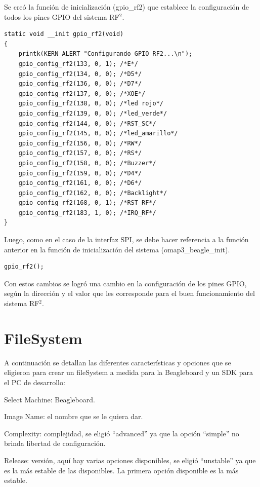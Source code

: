 Se creó la función de inicialización (gpio\_rf2) que establece la configuración de todos los pines GPIO del sistema RF$^{2}$.

\begin{verbatim}
static void __init gpio_rf2(void)
{
    printk(KERN_ALERT "Configurando GPIO RF2...\n");
    gpio_config_rf2(133, 0, 1); /*E*/
    gpio_config_rf2(134, 0, 0); /*D5*/
    gpio_config_rf2(136, 0, 0); /*D7*/
    gpio_config_rf2(137, 0, 0); /*XOE*/
    gpio_config_rf2(138, 0, 0); /*led rojo*/
    gpio_config_rf2(139, 0, 0); /*led_verde*/
    gpio_config_rf2(144, 0, 0); /*RST_SC*/
    gpio_config_rf2(145, 0, 0); /*led_amarillo*/
    gpio_config_rf2(156, 0, 0); /*RW*/
    gpio_config_rf2(157, 0, 0); /*RS*/
    gpio_config_rf2(158, 0, 0); /*Buzzer*/
    gpio_config_rf2(159, 0, 0); /*D4*/
    gpio_config_rf2(161, 0, 0); /*D6*/
    gpio_config_rf2(162, 0, 0); /*Backlight*/
    gpio_config_rf2(168, 0, 1); /*RST_RF*/
    gpio_config_rf2(183, 1, 0); /*IRQ_RF*/
}
\end{verbatim}

Luego, como en el caso de la interfaz SPI, se debe hacer referencia a la función anterior en la función de inicialización del sistema (omap3\_beagle\_init).

\begin{verbatim}
gpio_rf2();
\end{verbatim}

Con estos cambios se logró una cambio en la configuración de los pines GPIO, según la dirección y el valor que les corresponde para el buen funcionamiento del sistema RF$^{2}$.

\section{FileSystem}\label{narc}

A continuación se detallan las diferentes características y opciones que se eligieron para crear un fileSystem a medida para la Beagleboard y un SDK para el PC de desarrollo:

\bigskip
Select Machine: Beagleboard.

\bigskip
Image Name: el nombre que se le quiera dar.

\bigskip
Complexity: complejidad, se eligió “advanced” ya que la opción “simple” no brinda libertad de configuración.

\bigskip
Release: versión, aquí hay varias opciones disponibles, se eligió “unstable” ya que es la más estable de las disponibles. La primera opción disponible es la más estable.

